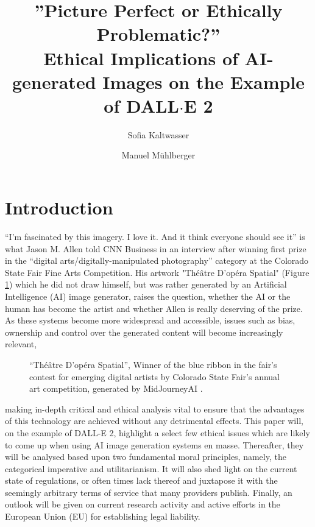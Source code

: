 \documentclass[10pt,twocolumn,twoside]{osajnl}
\title{”Picture Perfect or Ethically Problematic?” \\ Ethical Implications of AI-generated Images on the Example of DALL$\cdot$E 2}
\author[1]{Sofia Kaltwasser}
\author[2]{Manuel Mühlberger}
\affil[1]{University of Potsdam}
\affil[2]{School of Computation, Information and Technology, TU Munich}
\begin{document}
\onehalfspacing

\maketitle

\section{Introduction}
“I’m fascinated by this imagery. I love it. And it think everyone should see it” is what Jason M. Allen told CNN Business in an interview after winning first prize in the “digital arts/digitally-manipulated photography” category at the Colorado State Fair Fine Arts Competition\cite{JasonMAllenCNN}.
His artwork "Théâtre D’opéra Spatial" (Figure \ref{Theatre}) which he did not draw himself, but was rather generated by an Artificial Intelligence (AI) image generator, raises the question, whether the AI or the human has become the artist and whether Allen is really deserving of the prize.
As these systems become more widespread and accessible, issues such as bias, ownership and control over the generated content will become increasingly relevant, 
\begin{figure}[H]
	\centering
	\caption{“Théâtre D’opéra Spatial”, Winner of the blue ribbon in the fair’s contest for emerging digital artists by Colorado State Fair’s annual art competition, generated by MidJourneyAI \cite{OperaSpecial}.}
	\label{Theatre}
\end{figure}
\noindent
making in-depth critical and ethical analysis vital to ensure that the advantages of this technology are achieved without any detrimental effects. 
This paper will, on the example of DALL-E 2, highlight a select few ethical issues which are likely to come up when using AI image generation systems en masse. 
Thereafter, they will be analysed based upon two fundamental moral principles, namely, the categorical imperative and utilitarianism. 
It will also shed light on the current state of regulations, or often times lack thereof and juxtapose it with the seemingly arbitrary terms of service that many providers publish. 
Finally, an outlook will be given on current research activity and active efforts in the European Union (EU) for establishing legal liability. 
\end{document}
